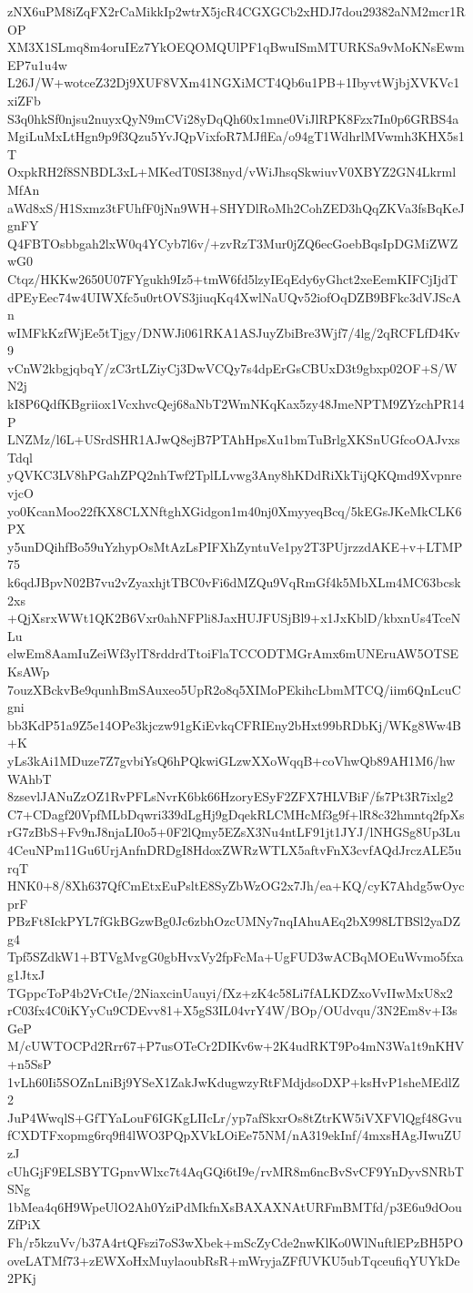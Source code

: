 zNX6uPM8iZqFX2rCaMikkIp2wtrX5jcR4CGXGCb2xHDJ7dou29382aNM2mcr1ROP
XM3X1SLmq8m4oruIEz7YkOEQOMQUlPF1qBwuISmMTURKSa9vMoKNsEwmEP7u1u4w
L26J/W+wotceZ32Dj9XUF8VXm41NGXiMCT4Qb6u1PB+1IbyvtWjbjXVKVc1xiZFb
S3q0hkSf0njsu2nuyxQyN9mCVi28yDqQh60x1mne0ViJlRPK8Fzx7In0p6GRBS4a
MgiLuMxLtHgn9p9f3Qzu5YvJQpVixfoR7MJflEa/o94gT1WdhrlMVwmh3KHX5s1T
OxpkRH2f8SNBDL3xL+MKedT0SI38nyd/vWiJhsqSkwiuvV0XBYZ2GN4LkrmlMfAn
aWd8xS/H1Sxmz3tFUhfF0jNn9WH+SHYDlRoMh2CohZED3hQqZKVa3fsBqKeJgnFY
Q4FBTOsbbgah2lxW0q4YCyb7l6v/+zvRzT3Mur0jZQ6ecGoebBqsIpDGMiZWZwG0
Ctqz/HKKw2650U07FYgukh9Iz5+tmW6fd5lzyIEqEdy6yGhct2xeEemKIFCjIjdT
dPEyEec74w4UIWXfc5u0rtOVS3jiuqKq4XwlNaUQv52iofOqDZB9BFkc3dVJScAn
wIMFkKzfWjEe5tTjgy/DNWJi061RKA1ASJuyZbiBre3Wjf7/4lg/2qRCFLfD4Kv9
vCnW2kbgjqbqY/zC3rtLZiyCj3DwVCQy7s4dpErGsCBUxD3t9gbxp02OF+S/WN2j
kI8P6QdfKBgriiox1VcxhvcQej68aNbT2WmNKqKax5zy48JmeNPTM9ZYzchPR14P
LNZMz/l6L+USrdSHR1AJwQ8ejB7PTAhHpsXu1bmTuBrlgXKSnUGfcoOAJvxsTdql
yQVKC3LV8hPGahZPQ2nhTwf2TplLLvwg3Any8hKDdRiXkTijQKQmd9XvpnrevjcO
yo0KcanMoo22fKX8CLXNftghXGidgon1m40nj0XmyyeqBcq/5kEGsJKeMkCLK6PX
y5unDQihfBo59uYzhypOsMtAzLsPIFXhZyntuVe1py2T3PUjrzzdAKE+v+LTMP75
k6qdJBpvN02B7vu2vZyaxhjtTBC0vFi6dMZQu9VqRmGf4k5MbXLm4MC63bcsk2xs
+QjXsrxWWt1QK2B6Vxr0ahNFPli8JaxHUJFUSjBl9+x1JxKblD/kbxnUs4TceNLu
elwEm8AamIuZeiWf3ylT8rddrdTtoiFlaTCCODTMGrAmx6mUNEruAW5OTSEKsAWp
7ouzXBckvBe9qunhBmSAuxeo5UpR2o8q5XIMoPEkihcLbmMTCQ/iim6QnLcuCgni
bb3KdP51a9Z5e14OPe3kjczw91gKiEvkqCFRIEny2bHxt99bRDbKj/WKg8Ww4B+K
yLs3kAi1MDuze7Z7gvbiYsQ6hPQkwiGLzwXXoWqqB+coVhwQb89AH1M6/hwWAhbT
8zsevlJANuZzOZ1RvPFLsNvrK6bk66HzoryESyF2ZFX7HLVBiF/fs7Pt3R7ixlg2
C7+CDagf20VpfMLbDqwri339dLgHj9gDqekRLCMHcMf3g9f+lR8c32hmntq2fpXs
rG7zBbS+Fv9nJ8njaLI0o5+0F2lQmy5EZsX3Nu4ntLF91jt1JYJ/lNHGSg8Up3Lu
4CeuNPm11Gu6UrjAnfnDRDgI8HdoxZWRzWTLX5aftvFnX3cvfAQdJrczALE5urqT
HNK0+8/8Xh637QfCmEtxEuPsltE8SyZbWzOG2x7Jh/ea+KQ/cyK7Ahdg5wOycprF
PBzFt8IckPYL7fGkBGzwBg0Jc6zbhOzcUMNy7nqIAhuAEq2bX998LTBSl2yaDZg4
Tpf5SZdkW1+BTVgMvgG0gbHvxVy2fpFcMa+UgFUD3wACBqMOEuWvmo5fxag1JtxJ
TGppcToP4b2VrCtIe/2NiaxcinUauyi/fXz+zK4c58Li7fALKDZxoVvIIwMxU8x2
rC03fx4C0iKYyCu9CDEvv81+X5gS3IL04vrY4W/BOp/OUdvqu/3N2Em8v+I3sGeP
M/cUWTOCPd2Rrr67+P7usOTeCr2DIKv6w+2K4udRKT9Po4mN3Wa1t9nKHV+n5SsP
1vLh60Ii5SOZnLniBj9YSeX1ZakJwKdugwzyRtFMdjdsoDXP+ksHvP1sheMEdlZ2
JuP4WwqlS+GfTYaLouF6IGKgLIIcLr/yp7afSkxrOs8tZtrKW5iVXFVlQgf48Gvu
fCXDTFxopmg6rq9fl4lWO3PQpXVkLOiEe75NM/nA319ekInf/4mxsHAgJIwuZUzJ
cUhGjF9ELSBYTGpnvWlxc7t4AqGQi6tI9e/rvMR8m6ncBvSvCF9YnDyvSNRbTSNg
1bMea4q6H9WpeUlO2Ah0YziPdMkfnXsBAXAXNAtURFmBMTfd/p3E6u9dOouZfPiX
Fh/r5kzuVv/b37A4rtQFszi7oS3wXbek+mScZyCde2nwKlKo0WlNuftlEPzBH5PO
oveLATMf73+zEWXoHxMuylaoubRsR+mWryjaZFfUVKU5ubTqceufiqYUYkDe2PKj
